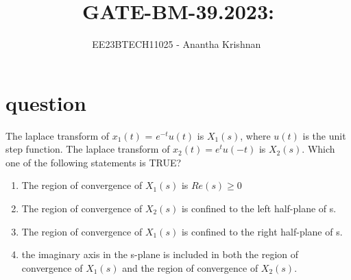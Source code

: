 \documentclass[journal,12pt,onecolumn]{IEEEtran}
\theoremstyle{remark}
\begin{document}

\vspace{3cm}

\title{GATE-BM-39.2023: }
\author{EE23BTECH11025 - Anantha Krishnan $^{}$%
}
\maketitle
\bigskip



\section{question}

The laplace transform of $x_1(t)$ = $e^{-t}u(t)$ is $X_1(s)$, where $u(t)$ is the unit step function. The laplace transform of $x_2(t) = e^tu(-t)$ is $X_2(s)$. Which one of the following statements is TRUE?
\begin{enumerate}
    \item The region of convergence of $X_1(s)$ is $Re(s) \geq 0$
    \item The region of convergence of $X_2(s)$ is confined to the left half-plane of s.
    \item The region of convergence of $X_1(s)$ is confined to the right half-plane of s.
    \item the imaginary axis in the s-plane is included in both the region of convergence of $X_1(s)$ and the region of convergence of $X_2(s)$.
\end{enumerate}
 
\end{document}
